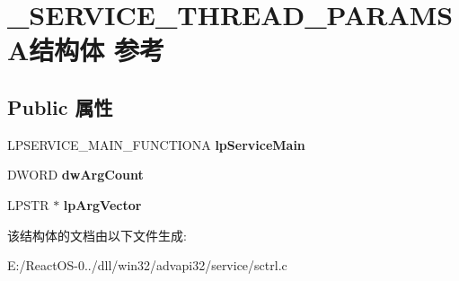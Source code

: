 \hypertarget{struct___s_e_r_v_i_c_e___t_h_r_e_a_d___p_a_r_a_m_s_a}{}\section{\+\_\+\+S\+E\+R\+V\+I\+C\+E\+\_\+\+T\+H\+R\+E\+A\+D\+\_\+\+P\+A\+R\+A\+M\+S\+A结构体 参考}
\label{struct___s_e_r_v_i_c_e___t_h_r_e_a_d___p_a_r_a_m_s_a}
\subsection*{Public 属性}
\begin{DoxyCompactItemize}
\item 
\mbox{\label{struct___s_e_r_v_i_c_e___t_h_r_e_a_d___p_a_r_a_m_s_a_a24f5c4a5c9c589c4a12b08273a43d144}} 
L\+P\+S\+E\+R\+V\+I\+C\+E\+\_\+\+M\+A\+I\+N\+\_\+\+F\+U\+N\+C\+T\+I\+O\+NA {\bfseries lp\+Service\+Main}
\item 
\mbox{\label{struct___s_e_r_v_i_c_e___t_h_r_e_a_d___p_a_r_a_m_s_a_a8e60ef22fa500e92fbb6785dc2fcbd37}} 
D\+W\+O\+RD {\bfseries dw\+Arg\+Count}
\item 
\mbox{\label{struct___s_e_r_v_i_c_e___t_h_r_e_a_d___p_a_r_a_m_s_a_a2d8cba28bbda5f80a3e0dca18e255d64}} 
L\+P\+S\+TR $\ast$ {\bfseries lp\+Arg\+Vector}
\end{DoxyCompactItemize}


该结构体的文档由以下文件生成\+:\begin{DoxyCompactItemize}
\item 
E\+:/\+React\+O\+S-\/0../dll/win32/advapi32/service/sctrl.\+c\end{DoxyCompactItemize}
